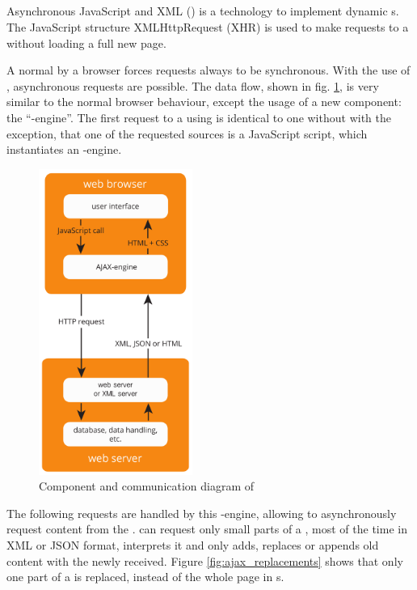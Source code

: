 \subsection{\ajax{}\label{ajax}}
Asynchronous JavaScript and XML (\ajax{}) is a technology to implement dynamic \webPage{}s.
The JavaScript structure XMLHttpRequest (XHR) is used to make requests to a \webServer{} without loading a full new page.

A normal \httpRequest{} by a browser forces requests always to be synchronous.
With the use of \ajax{}, asynchronous requests are possible.
The data flow, shown in fig. \ref{fig:ajax_components}, is very similar to the normal browser behaviour, except the usage of a new component: the \enquote{\ajax{}-engine}.
The first request to a \webServer{} using \ajax{} is identical to one without \ajax{} with the exception, that one of the requested sources is a JavaScript script, which instantiates an \ajax{}-engine.

\begin{figure}[H]
\centering 
\includegraphics[height=10cm]{images/ajax.pdf}
\caption[ajax_components]{Component and communication diagram of \ajax{}}
\label{fig:ajax_components}
\end{figure}

\noindent{}The following requests are handled by this \ajax{}-engine, allowing to asynchronously request content from the \webServer{}.
\ajax{} can request only small parts of a \webSite{}, most of the time in XML or JSON format, interprets it and only adds, replaces or appends old content with the newly received.
Figure \ref{fig:ajax_replacements} shows that only one part of a \webPage{} is replaced, instead of the whole page in \httpRequest{}s.

